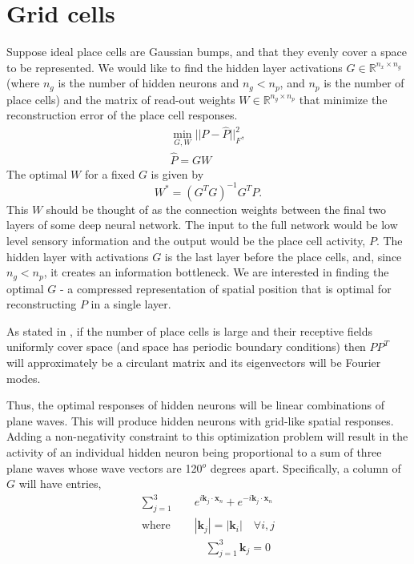 \documentclass[10pt,letterpaper,oneside]{article}
\begin{document}
\section{Grid cells}
Suppose ideal place cells are Gaussian bumps, and that they evenly cover a space to be represented. We would like to find the hidden layer activations $G \in \mathbb{R}^{n_x \times n_g}$ (where $n_g$ is the number of hidden neurons and $n_g < n_p$, and $n_p$ is the number of place cells) and the matrix of read-out weights $W \in \mathbb{R}^{n_g \times n_p}$ that minimize the reconstruction error of the place cell responses.
\begin{align}
\min_{G,W} || P - \hat{P} ||_{F}^2, \\ \hat{P} = GW
\end{align}
The optimal $W$ for a fixed $G$ is given by
\begin{equation} \label{eqn:optimReadOutWeight}
W^* = (G^T G)^{-1} G^T P.
\end{equation}
This $W$ should be thought of as the connection weights between the final two layers of some deep neural network. The input to the full network would be low level sensory information and the output would be the place cell activity, $P$. The hidden layer with activations $G$ is the last layer before the place cells, and, since $n_g < n_p$, it creates an information bottleneck. We are interested in finding the optimal $G$ - a compressed representation of spatial position that is optimal for reconstructing $P$ in a single layer.

As stated in \cite{sorscher2019unified}, if the number of place cells is large and their receptive fields uniformly cover space (and space has periodic boundary conditions) then $PP^T$ will approximately be a circulant matrix and its eigenvectors will be Fourier modes.

Thus, the optimal responses of hidden neurons will be linear combinations of plane waves. This will produce hidden neurons with grid-like spatial responses. Adding a non-negativity constraint to this optimization problem will result in the activity of an individual hidden neuron being proportional to a sum of three plane waves whose wave vectors are 120$^o$ degrees apart. Specifically, a column of $G$ will have entries,
\begin{align}
     \sum_{j=1}^{3} & e^{i \mathbf{k}_j \cdot \mathbf{x}_n } + e^{-i \mathbf{k}_j \cdot \mathbf{x}_n  } \label{eqn:planewavesum} \\
    \text{where } \quad & |\mathbf{k}_j| = |\mathbf{k}_i| \quad \forall i,j \\
    & \quad \sum_{j=1}^{3} \mathbf{k}_j = 0
\end{align}
\end{document}
